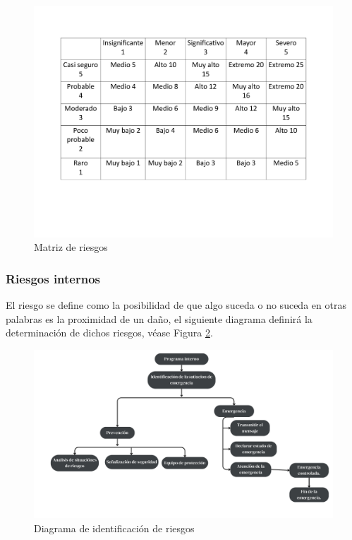     \begin{figure}[H]
        \centering
        \includegraphics[scale=0.28]{21/img/matriz.pdf}
        \caption{Matriz de riesgos}
        \label{fig:matriz}
    \end{figure}
    
    \subsubsection{Riesgos internos}
    
    El riesgo se define como la posibilidad de que algo suceda o no suceda en otras palabras es la proximidad de un daño, el siguiente diagrama definirá la determinación de dichos riesgos, véase Figura \ref{fig:diagramaIdentificacionRiesgos}. 
    
    \begin{figure}[H]
        \centering
        \includegraphics[scale=0.150]{21/img/diagramaIdentificacionRiesgos.pdf}
        \caption{Diagrama de identificación de riesgos}
        \label{fig:diagramaIdentificacionRiesgos}
    \end{figure}
    
